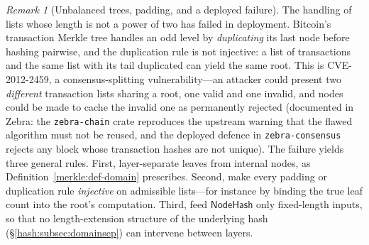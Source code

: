 \documentclass[11pt,a4paper]{article}
\theoremstyle{definition}
\theoremstyle{remark}
\newtheorem{remark}[theorem]{Remark}
\begin{document}
\begin{remark}[Unbalanced trees, padding, and a deployed failure]
\label{merkle:rem-unbalanced}
The handling of lists whose length is not a power of two has failed in
deployment. Bitcoin's transaction Merkle tree handles an odd level by
\emph{duplicating} its last node before hashing pairwise, and the
duplication rule is not injective: a list of transactions and the same
list with its tail duplicated can yield the same root. This is
CVE-2012-2459, a consensus-splitting vulnerability---an attacker could
present two \emph{different} transaction lists sharing a root, one
valid and one invalid, and nodes could be made to cache the invalid one
as permanently rejected (documented in Zebra: the \texttt{zebra-chain}
crate reproduces the upstream warning that the flawed algorithm must
not be reused, and the deployed defence in \texttt{zebra-consensus}
rejects any block whose transaction hashes are not unique).
The failure yields three general rules. First, layer-separate leaves
from internal nodes, as Definition~\ref{merkle:def-domain}
prescribes. Second, make every
padding or duplication rule \emph{injective} on admissible lists---for
instance by binding the true leaf count into the root's computation.
Third, feed \(\mathsf{NodeHash}\) only fixed-length inputs, so that
no length-extension structure of the underlying hash
(\S\ref{hash:subsec:domainsep}) can intervene between layers.
\end{remark}
\end{document}
